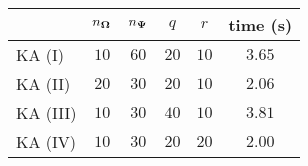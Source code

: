 \centering
\renewcommand{\arraystretch}{1.2}
\begin{tabular}{@{}lccccc@{}}
\toprule
 & $n_{\boldsymbol{\Omega}}$ & $n_{\boldsymbol{\Psi}}$ & $q$ & $r$ & time (s)\\
\midrule
KA (I) & $10$ & $60$ & $20$ & $10$ & $3.65$ \\
KA (II) & $20$ & $30$ & $20$ & $10$ & $2.06$ \\
KA (III) & $10$ & $30$ & $40$ & $10$ & $3.81$ \\
KA (IV) & $10$ & $30$ & $20$ & $20$ & $2.00$ \\
\bottomrule
\end{tabular}
